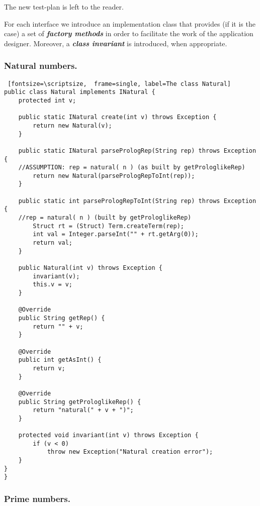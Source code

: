 \documentclass{../llncs}
\begin{document}
The new test-plan is left to the reader. 

For each interface we introduce an implementation class that provides (if it is the case) a set of \textit{\textbf{factory methods}} \cite{gof94} in order to facilitate the work of the application designer. Moreover, a \textit{\textbf{class invariant}} is introduced, when appropriate.

\subsubsection{Natural numbers.\\}

\begin{Verbatim} [fontsize=\scriptsize,  frame=single, label=The class Natural]
public class Natural implements INatural {
	protected int v;

	public static INatural create(int v) throws Exception {
		return new Natural(v);
	}

	public static INatural parsePrologRep(String rep) throws Exception {
	//ASSUMPTION: rep = natural( n ) (as built by getProloglikeRep)
		return new Natural(parsePrologRepToInt(rep));
	}

	public static int parsePrologRepToInt(String rep) throws Exception {
	//rep = natural( n ) (built by getProloglikeRep)
		Struct rt = (Struct) Term.createTerm(rep);
		int val = Integer.parseInt("" + rt.getArg(0));
		return val;
	}

	public Natural(int v) throws Exception {
		invariant(v);
		this.v = v;
	}

	@Override
	public String getRep() {
		return "" + v;
	}

	@Override
	public int getAsInt() {
		return v;
	}

	@Override
	public String getProloglikeRep() {
		return "natural(" + v + ")";
	}

	protected void invariant(int v) throws Exception {
		if (v < 0)
			throw new Exception("Natural creation error");
	}
}
}
\end{Verbatim}

\subsubsection{Prime numbers.\\}
\end{document}
